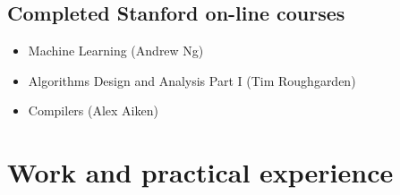 \documentclass[letterpaper]{resume}
\begin{document}
\subsection{Completed Stanford on-line courses}
\begin{itemize}
    \item Machine Learning (Andrew Ng)
    \item Algorithms Design and Analysis Part I (Tim Roughgarden)
    \item Compilers (Alex Aiken)
\end{itemize}

\pagebreak
\section{Work and practical experience}
\end{document}
